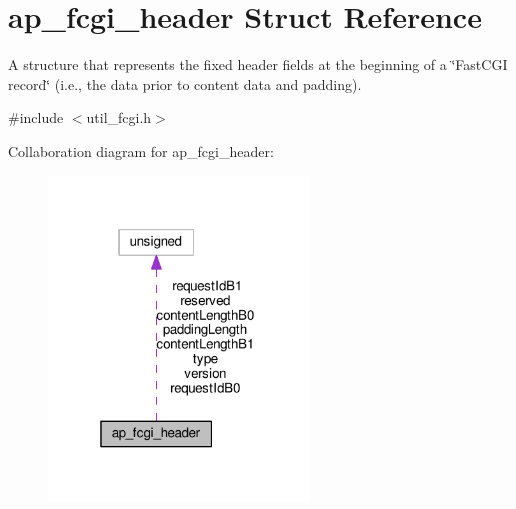 \hypertarget{structap__fcgi__header}{}\section{ap\+\_\+fcgi\+\_\+header Struct Reference}
\label{structap__fcgi__header}


A structure that represents the fixed header fields at the beginning of a \char`\"{}\+Fast\+C\+G\+I record\char`\"{} (i.\+e., the data prior to content data and padding).  




{\ttfamily \#include $<$util\+\_\+fcgi.\+h$>$}



Collaboration diagram for ap\+\_\+fcgi\+\_\+header\+:
\nopagebreak
\begin{figure}[H]
\begin{center}
\leavevmode
\includegraphics[width=196pt]{structap__fcgi__header__coll__graph}
\end{center}
\end{figure}

